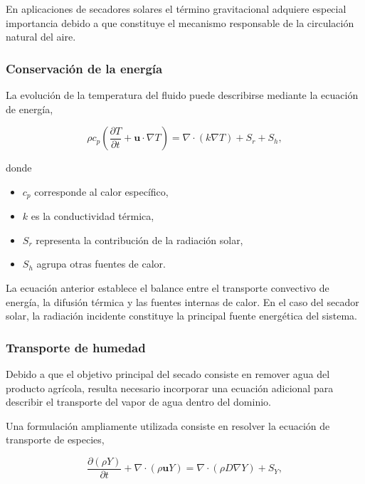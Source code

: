 En aplicaciones de secadores solares el término gravitacional adquiere especial importancia debido a que constituye el mecanismo responsable de la circulación natural del aire.

\subsubsection{Conservación de la energía}

La evolución de la temperatura del fluido puede describirse mediante la ecuación de energía,

\begin{equation}
\rho c_p
\left(
\frac{\partial T}{\partial t}
+\mathbf{u}\cdot\nabla T
\right)
=
\nabla\cdot(k\nabla T)
+
S_r
+
S_h,
\label{eq:energia}
\end{equation}

donde

\begin{itemize}

\item $c_p$ corresponde al calor específico,

\item $k$ es la conductividad térmica,

\item $S_r$ representa la contribución de la radiación solar,

\item $S_h$ agrupa otras fuentes de calor.
\end{itemize}

La ecuación anterior establece el balance entre el transporte convectivo de energía, la difusión térmica y las fuentes internas de calor. En el caso del secador solar, la radiación incidente constituye la principal fuente energética del sistema.

\subsubsection{Transporte de humedad}

Debido a que el objetivo principal del secado consiste en remover agua del producto agrícola, resulta necesario incorporar una ecuación adicional para describir el transporte del vapor de agua dentro del dominio.

Una formulación ampliamente utilizada consiste en resolver la ecuación de transporte de especies,

\begin{equation}
\frac{\partial(\rho Y)}
{\partial t}
+
\nabla\cdot(\rho\mathbf{u}Y)
=
\nabla\cdot
(\rho D\nabla Y)
+
S_Y,
\label{eq:species}
\end{equation}

